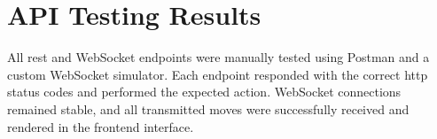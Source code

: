 


\section{API Testing Results}

All \gls{rest} and WebSocket endpoints were manually tested using Postman and a custom WebSocket simulator. Each endpoint responded with the correct \gls{http} status codes and performed the expected action. WebSocket connections remained stable, and all transmitted moves were successfully received and rendered in the frontend interface.\\

